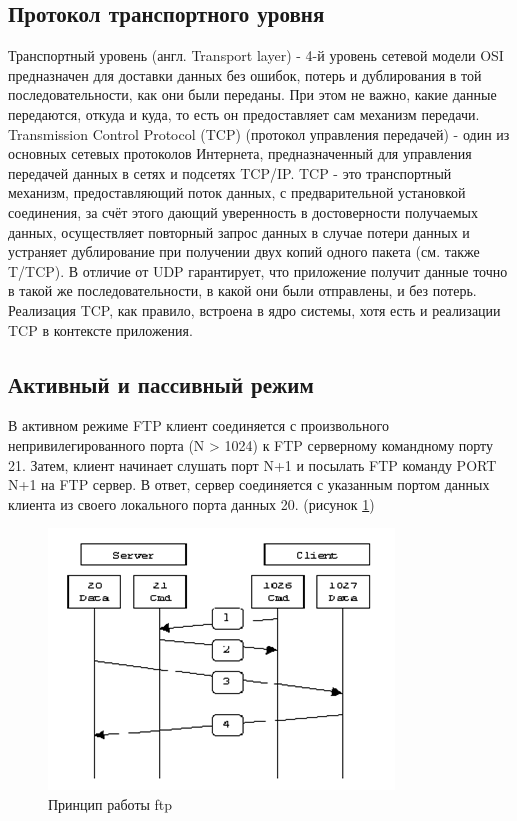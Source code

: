 \subsection{Протокол транспортного уровня}
Транспортный уровень (англ. Transport layer) - 4-й уровень сетевой модели OSI предназначен для доставки данных без ошибок, потерь и дублирования в той последовательности, как они были переданы. 
При этом не важно, какие данные передаются, откуда и куда, то есть он предоставляет сам механизм передачи. 
Transmission Control Protocol (TCP) (протокол управления передачей) - один из основных сетевых протоколов Интернета, предназначенный для управления передачей данных в сетях и подсетях TCP/IP. TCP - это транспортный механизм, предоставляющий поток данных, с предварительной установкой соединения, за счёт этого дающий уверенность в достоверности получаемых данных, осуществляет повторный запрос данных в случае потери данных и устраняет дублирование при получении двух копий одного пакета (см. также T/TCP). 
В отличие от UDP гарантирует, что приложение получит данные точно в такой же последовательности, в какой они были отправлены, и без потерь. 
Реализация TCP, как правило, встроена в ядро системы, хотя есть и реализации TCP в контексте приложения.

\subsection{Активный и пассивный режим}
В активном режиме FTP клиент соединяется с произвольного непривилегированного порта (N > 1024) к FTP серверному командному порту 21. 
Затем, клиент начинает слушать порт N+1 и посылать FTP команду PORT N+1 на FTP сервер. 
В ответ, сервер соединяется с указанным портом данных клиента из своего локального порта данных 20. (рисунок \ref{fig:1})
\begin{figure}[H]
	\centering
	\includegraphics[width=0.7\linewidth]{src/img/1}
	\caption{Принцип работы ftp}
	\label{fig:1}
\end{figure}

